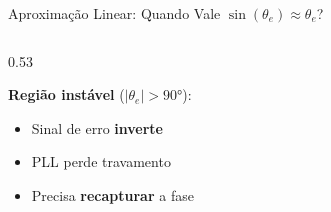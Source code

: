 \begin{frame}{Aproximação Linear: Quando Vale $\sin(\theta_e) \approx \theta_e$?}
{\begin{columns}[c]
\begin{column}{0.53\textwidth}
\vspace{0.2cm}

\textbf{\color{red!70!black} Região instável} ($|\theta_e| > 90°$):
\begin{itemize}\setlength{\itemsep}{1pt}
\item Sinal de erro \textbf{inverte}
\item PLL perde travamento
\item Precisa \textbf{recapturar} a fase
\end{itemize}

\end{column}
\end{columns}
}


\end{frame}

